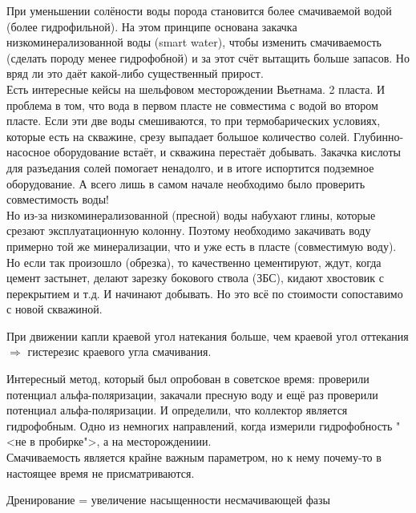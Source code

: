 \documentclass[main.tex]{subfiles}
\begin{document}


При уменьшении солёности воды порода становится более смачиваемой водой (более гидрофильной). На этом принципе основана закачка низкоминерализованной воды (smart water), чтобы изменить смачиваемость (сделать породу менее гидрофобной) и за этот счёт вытащить больше запасов. Но вряд ли это даёт какой-либо существенный прирост.\\

Есть интересные кейсы на шельфовом месторождении Вьетнама. 2 пласта. И проблема в том, что вода в первом пласте не совместима с водой во втором пласте. Если эти две воды смешиваются, то при термобарических условиях, которые есть на скважине, срезу выпадает большое количество солей. Глубинно-насосное оборудование встаёт, и скважина перестаёт добывать. Закачка кислоты для разъедания солей помогает ненадолго, и в итоге испортится подземное оборудование. А всего лишь в самом начале необходимо было проверить совместимость воды!\\

Но из-за низкоминерализованной (пресной) воды набухают глины, которые срезают эксплуатационную колонну. Поэтому необходимо закачивать воду примерно той же минерализации, что и уже есть в пласте (совместимую воду). Но если так произошло (обрезка), то качественно цементируют, ждут, когда цемент застынет, делают зарезку бокового ствола (ЗБС), кидают хвостовик с перекрытием и т.д. И начинают добывать. Но это всё по стоимости сопоставимо с новой скважиной.


При движении капли краевой угол натекания больше, чем краевой угол оттекания $\Rightarrow$ гистерезис краевого угла смачивания.


Интересный метод, который был опробован в советское время: проверили потенциал альфа-поляризации, закачали пресную воду и ещё раз проверили потенциал альфа-поляризации. И определили, что коллектор является гидрофобным. Одно из немногих направлений, когда измерили гидрофобность "<не в пробирке">, а на месторождениии.\\

Смачиваемость является крайне важным параметром, но к нему почему-то в настоящее время не присматриваются.


Дренирование = увеличение насыщенности несмачивающей фазы\\
\end{document}
